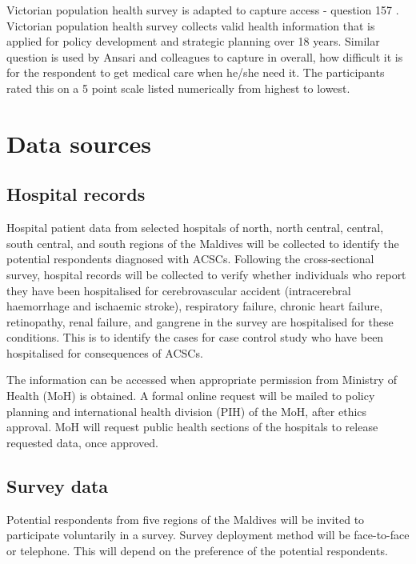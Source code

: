 Victorian population health survey is adapted to capture access - question 157 \cite{Victorian:healthsurvey:2017}. Victorian population health survey collects valid health information that is applied for policy development and strategic planning over 18 years. Similar question is used by Ansari and colleagues \cite{ansari2006access} to capture in overall, how difficult it is for the respondent to get medical care when he/she need it. The participants rated this on a 5 point scale listed numerically from highest to lowest.  

\section{Data sources}

\subsection{Hospital records}

Hospital patient data from selected hospitals of north, north central, central, south central, and south regions of the Maldives will be collected to identify the potential respondents diagnosed with ACSCs. Following the cross-sectional survey, hospital records will be collected to verify whether individuals who report they have been hospitalised for cerebrovascular accident (intracerebral haemorrhage and ischaemic stroke), respiratory failure, chronic heart failure, retinopathy, renal failure, and gangrene in the survey are hospitalised for these conditions. This is to identify the cases for case control study who have been hospitalised for consequences of ACSCs.

The information can be accessed when appropriate permission from Ministry of Health (MoH) is obtained. A formal online request will be mailed to policy planning and international health division (PIH) of the MoH, after ethics approval. MoH will request public health sections of the hospitals to release requested data, once approved. 

\subsection{Survey data}

Potential respondents from five regions of the Maldives will be invited to participate voluntarily in a survey. Survey deployment method will be face-to-face or telephone. This will depend on the preference of the potential respondents. 

